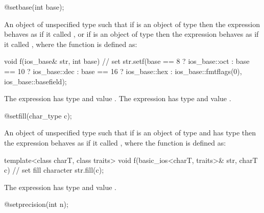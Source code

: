 %
\begin{itemdecl}
@\unspec@ setbase(int base);
\end{itemdecl}

\begin{itemdescr}
\pnum
\returns
An object of unspecified type such that if
is an object of type
then the expression
behaves as if it called
,
or if
is an object of type
then the expression
behaves as if it called
, where the function  is defined as:
\begin{codeblock}
void f(ios_base& str, int base) {
  // set 
  str.setf(base ==  8 ? ios_base::oct :
      base == 10 ? ios_base::dec :
      base == 16 ? ios_base::hex :
      ios_base::fmtflags(0), ios_base::basefield);
}
\end{codeblock}

The expression
has type
and value
.
The expression
has type
and value
.
\end{itemdescr}

%
\begin{itemdecl}
@\unspec@ setfill(char_type c);
\end{itemdecl}

\begin{itemdescr}
\pnum
\returns
An object of unspecified type such that if
is an object of type
and  has type
then the expression
behaves as if it called
, where the function  is defined as:
\begin{codeblock}
template<class charT, class traits>
void f(basic_ios<charT, traits>& str, charT c) {
  // set fill character
  str.fill(c);
}
\end{codeblock}

The expression
has type
and value
.
\end{itemdescr}

%
\begin{itemdecl}
@\unspec@ setprecision(int n);
\end{itemdecl}

